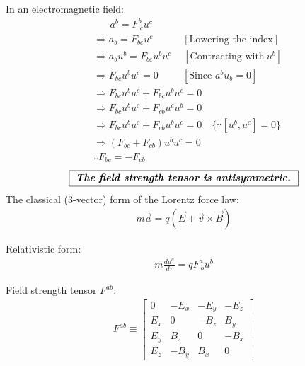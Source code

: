\documentclass[14pt]{article} %
\begin{document}
In an electromagnetic field:
\begin{align*}
    &\quad~~~ a^b = F^b_{\ c} u^c \\
   &\Rightarrow a_b = F_{bc} u^c \quad \quad\quad [\text{Lowering the index}] \\
   &\Rightarrow a_b u^b = F_{bc} u^b u^c \quad~[\text{Contracting with}~u^b] \\
   &\Rightarrow F_{bc} u^b u^c = 0 \quad~~\quad[\text{Since }a^b u_b = 0] \\  
   &\Rightarrow F_{bc} u^b u^c + F_{bc} u^b u^c = 0 \\
   &\Rightarrow F_{bc} u^b u^c + F_{cb} u^c u^b = 0 \\
   &\Rightarrow F_{bc} u^b u^c + F_{cb} u^b u^c = 0 \quad\{\because [u^b,u^c]=0 \}\\
    &\Rightarrow \left(F_{bc} + F_{cb}\right) u^b u^c = 0 \\
    &\therefore F_{bc} = -F_{cb}  
\end{align*}
$$\fbox{
\textbf{\textit{The field strength tensor is antisymmetric.}}
}
$$
The classical (3-vector) form of the Lorentz force law:
\begin{align*}
m \vec{a} = q \left( \vec{E} + \vec{v} \times \vec{B} \right)
\end{align*}

Relativistic form:
\begin{align*}
m \frac{du^a}{d\tau} = q F^a_{\ b} u^b
\end{align*}

Field strength tensor $F^{ab}$:
\begin{align*}
F^{ab} \equiv
\begin{bmatrix}
0 & -E_x & -E_y & -E_z \\
E_x & 0 & -B_z & B_y \\
E_y & B_z & 0 & -B_x \\
E_z & -B_y & B_x & 0
\end{bmatrix}
\end{align*}
\end{document}
